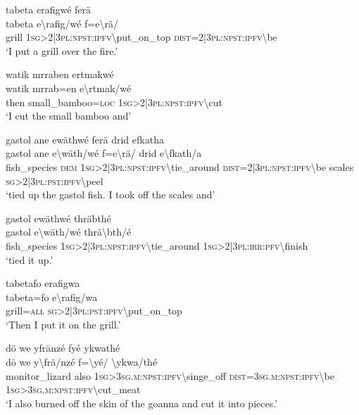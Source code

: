 \ea\label{ex:13:a1377}
tabeta erafigwé ferä\\
\gll tabeta	e{\textbackslash}rafig/wé	f=e{\textbackslash}rä/\\
     grill	1\textsc{sg}>2|3\textsc{pl}:\textsc{npst}:\textsc{ipfv}{\textbackslash}put\_on\_top	\textsc{dist}=2|3\textsc{pl}:\textsc{npst}:\textsc{ipfv}{\textbackslash}be\\
\glt `I put a grill over the fire.'
\z

\ea\label{ex:13:a1378}
watik mrraben ertmakwé\\
\gll watik	mrrab=en	e{\textbackslash}rtmak/wé\\
     then	small\_bamboo=\textsc{loc}	1\textsc{sg}>2|3\textsc{pl}:\textsc{npst}:\textsc{ipfv}{\textbackslash}cut\\
\glt `I cut the small bamboo and'
\z

\ea\label{ex:13:a1379}
gastol ane ewäthwé ferä drid efkatha\\
\gll gastol	ane	e{\textbackslash}wäth/wé	f=e{\textbackslash}rä/	drid	e{\textbackslash}fkath/a\\
     fish\_species	\textsc{dem}	1\textsc{sg}>2|3\textsc{pl}:\textsc{npst}:\textsc{ipfv}{\textbackslash}tie\_around	\textsc{dist}=2|3\textsc{pl}:\textsc{npst}:\textsc{ipfv}{\textbackslash}be	scales	\textsc{sg}>2|3\textsc{pl}:\textsc{pst}:\textsc{ipfv}{\textbackslash}peel\\
\glt `tied up the gastol fish. I took off the scales and'
\z

\ea\label{ex:13:a1380}
gastol ewäthwé thräbthé\\
\gll gastol	e{\textbackslash}wäth/wé	thrä{\textbackslash}bth/é\\
     fish\_species	1\textsc{sg}>2|3\textsc{pl}:\textsc{npst}:\textsc{ipfv}{\textbackslash}tie\_around	1\textsc{sg}>2|3\textsc{pl}:\textsc{irr}:\textsc{pfv}{\textbackslash}finish\\
\glt `tied it up.'
\z

\ea\label{ex:13:a1381}
tabetafo erafigwa\\
\gll tabeta=fo	e{\textbackslash}rafig/wa\\
     grill=\textsc{all}	\textsc{sg}>2|3\textsc{pl}:\textsc{pst}:\textsc{ipfv}{\textbackslash}put\_on\_top\\
\glt `Then I put it on the grill.'
\z

\ea\label{ex:13:a1382}
dö we yfränzé fyé ykwathé\\
\gll dö	we	y{\textbackslash}frä/nzé	f={\textbackslash}yé/	{\textbackslash}ykwa/thé\\
     monitor\_lizard	also	1\textsc{sg}>3\textsc{sg}.\textsc{m}:\textsc{npst}:\textsc{ipfv}{\textbackslash}singe\_off	\textsc{dist}=3\textsc{sg}.\textsc{m}:\textsc{npst}:\textsc{ipfv}{\textbackslash}be	1\textsc{sg}>3\textsc{sg}.\textsc{m}:\textsc{npst}:\textsc{ipfv}{\textbackslash}cut\_meat\\
\glt `I also burned off the skin of the goanna and cut it into pieces.'
\z

